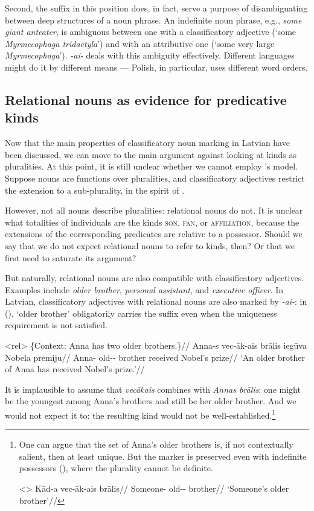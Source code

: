 \documentclass[a4paper, 12pt]{article}
\begin{document}
Second, the suffix in this position does, in fact, serve a purpose of disambiguating between deep structures of a noun phrase. An indefinite noun phrase, e.g., \textit{some giant anteater}, is ambiguous between one with a classificatory adjective (`some \textit{Myrmecophaga tridactyla}') and with an attributive one (`some very large \textit{Myrmecophaga}'). \textit{-ai-} deals with this ambiguity effectively. Different languages might do it by different means --- Polish, in particular, uses different word orders.

\subsection{Relational nouns as evidence for predicative kinds}\label{reln}

Now that the main properties of classificatory noun marking in Latvian have been discussed,  we can move to the main argument against looking at kinds as pluralities. At this point, it is still unclear whether we cannot employ \textcite{chierchia1998referencekindslanguages}'s model. Suppose nouns are functions over pluralities, and classificatory adjectives restrict the extension to a sub-plurality, in the spirit of \textcite{mendia2019referenceadhoc}.

However, not all nouns describe pluralities: relational nouns do not. It is unclear what totalities of individuals are the kinds \textsc{son}, \textsc{fan}, or \textsc{affiliation}, because the extensions of the corresponding predicates are relative to a possessor. Should we say that we do not expect relational nouns to refer to kinds, then? Or that we first need to saturate its argument?

But naturally, relational nouns are also compatible with classificatory adjectives. Examples include \textit{older brother}, \textit{personal assistant}, and \textit{executive officer}. In Latvian, classificatory adjectives with relational nouns are also marked by \textit{-ai-}: in (\nextx), `older brother' obligatorily carries the suffix even when the uniqueness requirement is not satisfied.

\ex<rel>
    \begingl
        \glpreamble \{Context: Anna has two older brothers.\}//
        \gla Anna-s vec-āk-ais brālis iegūva Nobela premiju//
        \glb Anna-\Gen{} old-\Comp-\Def{} brother received Nobel's prize//
        \glft `An older brother of Anna has received Nobel's prize.'//
    \endgl
\xe

It is implausible to assume that \textit{vecākais} combines with \textit{Annas brālis}: one might be the youngest among Anna's brothers and still be her older brother. And we would not expect it to: the resulting kind would not be well-established.\footnote{One can argue that the set of Anna's older brothers is, if not contextually salient, then at least unique. But the marker is preserved even with indefinite possessors (\nextx), where the plurality cannot be definite.

\ex<>
    \begingl
        \gla Kād-a vec-āk-ais brālis//
        \glb Someone-\Gen{} old-\Comp-\Def{} brother//
        \glft `Someone's older brother'//
    \endgl
\xe
}
\end{document}
